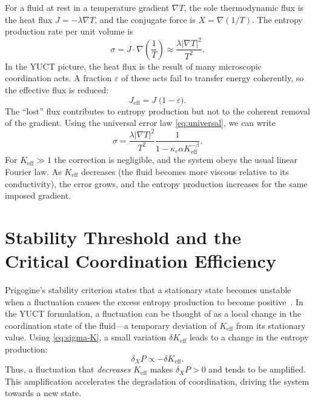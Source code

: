 \documentclass[12pt,a4paper]{article}
\begin{document}
	For a fluid at rest in a temperature gradient \(\nabla T\), the sole thermodynamic flux is the heat flux \(J = -\lambda \nabla T\), and the conjugate force is \(X = \nabla(1/T)\).  The entropy production rate per unit volume is
	\begin{equation}\label{eq:sigma}
		\sigma = J \cdot \nabla\left(\frac{1}{T}\right) \approx \frac{\lambda |\nabla T|^2}{T^2}.
	\end{equation}
	In the YUCT picture, the heat flux is the result of many microscopic coordination acts.  A fraction \(\varepsilon\) of these acts fail to transfer energy coherently, so the effective flux is reduced:
	\begin{equation}\label{eq:J-effective}
		J_{\mathrm{eff}} = J \; \bigl(1 - \varepsilon\bigr).
	\end{equation}
	The ``lost'' flux contributes to entropy production but not to the coherent removal of the gradient.  Using the universal error law \eqref{eq:universal}, we can write
	\begin{equation}\label{eq:sigma-K}
		\sigma = \frac{\lambda |\nabla T|^2}{T^2} \frac{1}{1 - \kappa_c\alpha K_{\mathrm{eff}}^{-\beta}}.
	\end{equation}
	For \(K_{\mathrm{eff}} \gg 1\) the correction is negligible, and the system obeys the usual linear Fourier law.  As \(K_{\mathrm{eff}}\) decreases (the fluid becomes more viscous relative to its conductivity), the error grows, and the entropy production increases for the same imposed gradient.
	
	\section{Stability Threshold and the Critical Coordination Efficiency}
	
	Prigogine's stability criterion states that a stationary state becomes unstable when a fluctuation causes the excess entropy production to become positive~\cite{Glansdorff1971}.  In the YUCT formulation, a fluctuation can be thought of as a local change in the coordination state of the fluid—a temporary deviation of \(K_{\mathrm{eff}}\) from its stationary value.  Using \eqref{eq:sigma-K}, a small variation \(\delta K_{\mathrm{eff}}\) leads to a change in the entropy production:
	\begin{equation}
		\delta_X P \propto - \delta K_{\mathrm{eff}}.
	\end{equation}
	Thus, a fluctuation that \emph{decreases} \(K_{\mathrm{eff}}\) makes \(\delta_X P > 0\) and tends to be amplified.  This amplification accelerates the degradation of coordination, driving the system towards a new state.
	
\end{document}
